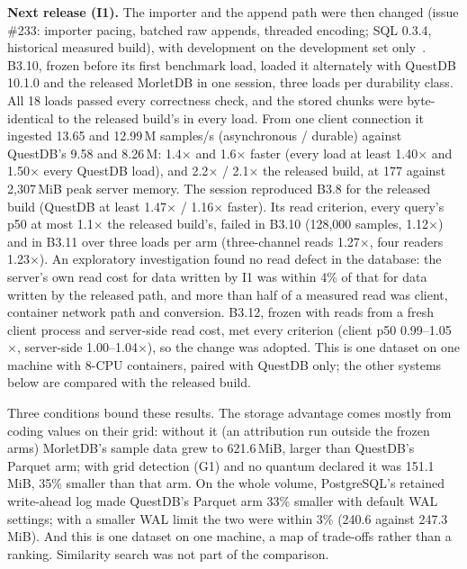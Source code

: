 \documentclass[sigconf,nonacm]{acmart}
\newcommand{\M}{MorletDB}
\begin{document}
\textbf{Next release (I1).} The importer and the append path were then changed (issue \#233: importer pacing, batched raw appends, threaded encoding; SQL 0.3.4, historical measured build), with development on the development set only~\cite{repo}. B3.10, frozen before its first benchmark load, loaded it alternately with QuestDB 10.1.0 and the released \M{} in one session, three loads per durability class. All 18 loads passed every correctness check, and the stored chunks were byte-identical to the released build's in every load. From one client connection it ingested 13.65 and 12.99\,M samples/s (asynchronous / durable) against QuestDB's 9.58 and 8.26\,M: 1.4$\times$ and 1.6$\times$ faster (every load at least 1.40$\times$ and 1.50$\times$ every QuestDB load), and 2.2$\times$ / 2.1$\times$ the released build, at 177 against 2,307\,MiB peak server memory. The session reproduced B3.8 for the released build (QuestDB at least 1.47$\times$ / 1.16$\times$ faster). Its read criterion, every query's p50 at most 1.1$\times$ the released build's, failed in B3.10 (128,000 samples, 1.12$\times$) and in B3.11 over three loads per arm (three-channel reads 1.27$\times$, four readers 1.23$\times$). An exploratory investigation found no read defect in the database: the server's own read cost for data written by I1 was within 4\% of that for data written by the released path, and more than half of a measured read was client, container network path and conversion. B3.12, frozen with reads from a fresh client process and server-side read cost, met every criterion (client p50 0.99--1.05$\times$, server-side 1.00--1.04$\times$), so the change was adopted. This is one dataset on one machine with 8-CPU containers, paired with QuestDB only; the other systems below are compared with the released build.

Three conditions bound these results. The storage advantage comes mostly from coding values on their grid: without it (an attribution run outside the frozen arms) \M{}'s sample data grew to 621.6\,MiB, larger than QuestDB's Parquet arm; with grid detection (G1) and no quantum declared it was 151.1\,MiB, 35\% smaller than that arm. On the whole volume, PostgreSQL's retained write-ahead log made QuestDB's Parquet arm 33\% smaller with default WAL settings; with a smaller WAL limit the two were within 3\% (240.6 against 247.3\,MiB). And this is one dataset on one machine, a map of trade-offs rather than a ranking. Similarity search was not part of the comparison.
\end{document}
